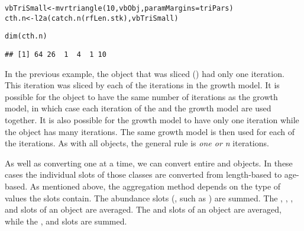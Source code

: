 \documentclass[a4paper,english,10pt]{article}\usepackage[]{graphicx}\usepackage[]{color}
\makeatletter
\newcommand{\hlnum}[1]{\textcolor[rgb]{0.063,0.58,0.627}{#1}}%
\newcommand{\hlstd}[1]{\textcolor[rgb]{0.196,0.196,0.196}{#1}}%
\newcommand{\hlkwb}[1]{\textcolor[rgb]{0.627,0,0.314}{#1}}%
\newcommand{\hlkwc}[1]{\textcolor[rgb]{0,0.631,0.314}{#1}}%
\newcommand{\hlkwd}[1]{\textcolor[rgb]{0.78,0.227,0.412}{#1}}%
\newenvironment{kframe}{%
 \def\at@end@of@kframe{}%
 \ifinner\ifhmode%
  \def\at@end@of@kframe{\end{minipage}}%
  \begin{minipage}{\columnwidth}%
 \fi\fi%
 \def\FrameCommand##1{\hskip\@totalleftmargin \hskip-\fboxsep
 \colorbox{shadecolor}{##1}\hskip-\fboxsep
     \hskip-\linewidth \hskip-\@totalleftmargin \hskip\columnwidth}%
 \MakeFramed {\advance\hsize-\width
   \@totalleftmargin\z@ \linewidth\hsize
   \@setminipage}}%
 {\par\unskip\endMakeFramed%
 \at@end@of@kframe}
\newenvironment{knitrout}{}{} %
\makeatother
\begin{document}
\begin{knitrout}
\color{fgcolor}\begin{kframe}
\begin{alltt}
\hlstd{vbTriSmall} \hlkwb{<-} \hlkwd{mvrtriangle}\hlstd{(}\hlnum{10}\hlstd{, vbObj,} \hlkwc{paramMargins} \hlstd{= triPars)}
\hlstd{cth.n} \hlkwb{<-} \hlkwd{l2a}\hlstd{(}\hlkwd{catch.n}\hlstd{(rfLen.stk), vbTriSmall)}
\end{alltt}
\end{kframe}
\end{knitrout}

\begin{knitrout}
\color{fgcolor}\begin{kframe}
\begin{alltt}
\hlkwd{dim}\hlstd{(cth.n)}
\end{alltt}
\begin{verbatim}
## [1] 64 26  1  4  1 10
\end{verbatim}
\end{kframe}
\end{knitrout}

In the previous example, the  object that was sliced () had only one iteration. This iteration was sliced by each of the iterations in the growth model. It is possible for the  object to have the same number of iterations as the growth model, in which case each iteration of the  and the growth model are used together. It is also possible for the growth model to have only one iteration while the  object has many iterations. The same growth model is then used for each of the  iterations. As with all  objects, the general rule is \emph{one or n} iterations.

As well as converting one  at a time, we can convert entire  and  objects. In these cases the individual  slots of those classes are converted from length-based to age-based. As mentioned above, the aggregation method depends on the type of values the slots contain. The abundance slots (, such as ) are summed. The , , ,  and  slots of an  object are averaged. The  and  slots of an  object are averaged, while the ,  and  slots are summed. 
\end{document}
